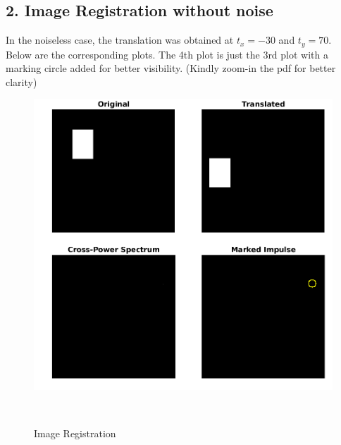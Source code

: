 \documentclass[12pt, a4paper]{article}
\begin{document}
\subsection*{2. Image Registration without noise}
In the noiseless case, the translation was obtained at $t_x = -30$ and $t_y = 70$. \\
Below are the corresponding plots. The 4th plot is just the 3rd plot with a marking circle added for better visibility. (Kindly zoom-in the pdf for better clarity)
\vspace*{65pt}
\begin{figure}[h!]
    \centering
    \renewcommand{\thefigure}{5.1}
    \begin{minipage}[c][1\width]{0.7\textwidth}
    	\hspace*{-0.8in}
    	\includegraphics[width=1.34\textwidth]{noiseless.png}
    	\caption{Image Registration}
	    \label{fig:5.1}
    \end{minipage} \\
\end{figure}
\vspace*{40pt}
\newpage
\end{document}
